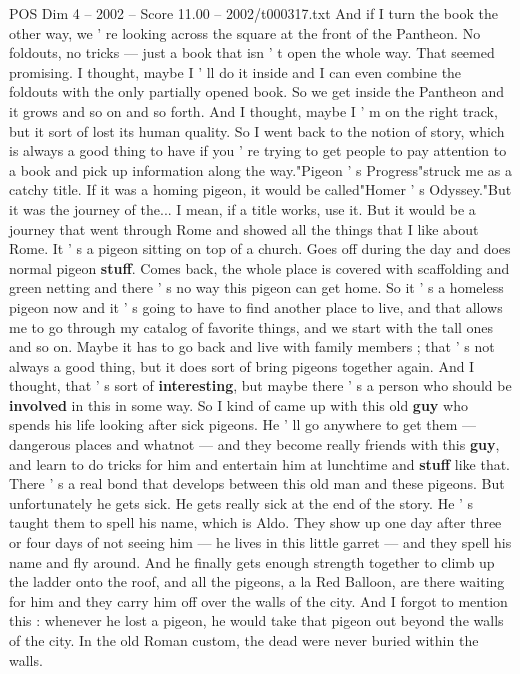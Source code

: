 \begin{textsample}{POS Dim 4 – 2002 – Score 11.00 – 2002/t000317.txt}
And if I turn the book the other way, we ' re looking across the square at the front of the Pantheon.
No foldouts, no tricks — just a book that isn ' t open the whole way.
That seemed promising.
I thought, maybe I ' ll do it inside and I can even combine the foldouts with the only partially opened book.
So we get inside the Pantheon and it grows and so on and so forth.
And I thought, maybe I ' m on the right track, but it sort of lost its human quality.
So I went back to the notion of story, which is always a good thing to have if you ' re trying to get people to pay attention to a book and pick up information along the way."Pigeon ' s Progress"struck me as a catchy title.
If it was a homing pigeon, it would be called"Homer ' s Odyssey."But it was the journey of the...
I mean, if a title works, use it.
But it would be a journey that went through Rome and showed all the things that I like about Rome.
It ' s a pigeon sitting on top of a church.
Goes off during the day and does normal pigeon \textbf{stuff}.
Comes back, the whole place is covered with scaffolding and green netting and there ' s no way this pigeon can get home.
So it ' s a homeless pigeon now and it ' s going to have to find another place to live, and that allows me to go through my catalog of favorite things, and we start with the tall ones and so on.
Maybe it has to go back and live with family members ; that ' s not always a good thing, but it does sort of bring pigeons together again.
And I thought, that ' s sort of \textbf{interesting}, but maybe there ' s a person who should be \textbf{involved} in this in some way.
So I kind of came up with this old \textbf{guy} who spends his life looking after sick pigeons.
He ' ll go anywhere to get them — dangerous places and whatnot — and they become really friends with this \textbf{guy}, and learn to do tricks for him and entertain him at lunchtime and \textbf{stuff} like that.
There ' s a real bond that develops between this old man and these pigeons.
But unfortunately he gets sick.
He gets really sick at the end of the story.
He ' s taught them to spell his name, which is Aldo.
They show up one day after three or four days of not seeing him — he lives in this little garret — and they spell his name and fly around.
And he finally gets enough strength together to climb up the ladder onto the roof, and all the pigeons, a la Red Balloon, are there waiting for him and they carry him off over the walls of the city.
And I forgot to mention this : whenever he lost a pigeon, he would take that pigeon out beyond the walls of the city.
In the old Roman custom, the dead were never buried within the walls.

\end{textsample}

